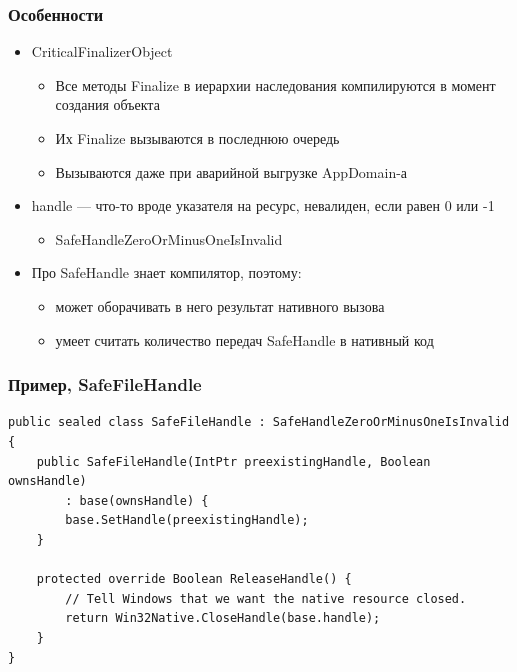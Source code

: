 \documentclass{../../slides-style}
\begin{document}
    \begin{frame}
        \frametitle{Особенности}
        \begin{itemize}
            \item CriticalFinalizerObject
            \begin{itemize}
                \item Все методы Finalize в иерархии наследования компилируются в момент создания объекта
                \item Их Finalize вызываются в последнюю очередь
                \item Вызываются даже при аварийной выгрузке AppDomain-а
            \end{itemize}
            \item handle --- что-то вроде указателя на ресурс, невалиден, если равен 0 или -1
            \begin{itemize}
                \item SafeHandleZeroOrMinusOneIsInvalid
            \end{itemize}
            \item Про SafeHandle знает компилятор, поэтому:
            \begin{itemize}
                \item может оборачивать в него результат нативного вызова
                \item умеет считать количество передач SafeHandle в нативный код
            \end{itemize}
        \end{itemize}
    \end{frame}

    \begin{frame}[fragile]
        \frametitle{Пример, SafeFileHandle}
        \begin{scriptsize}
            \begin{verbatim}
public sealed class SafeFileHandle : SafeHandleZeroOrMinusOneIsInvalid {
    public SafeFileHandle(IntPtr preexistingHandle, Boolean ownsHandle)
        : base(ownsHandle) {
        base.SetHandle(preexistingHandle);
    }

    protected override Boolean ReleaseHandle() {
        // Tell Windows that we want the native resource closed.
        return Win32Native.CloseHandle(base.handle);
    }
}
            \end{verbatim}
        \end{scriptsize}
    \end{frame}
\end{document}
